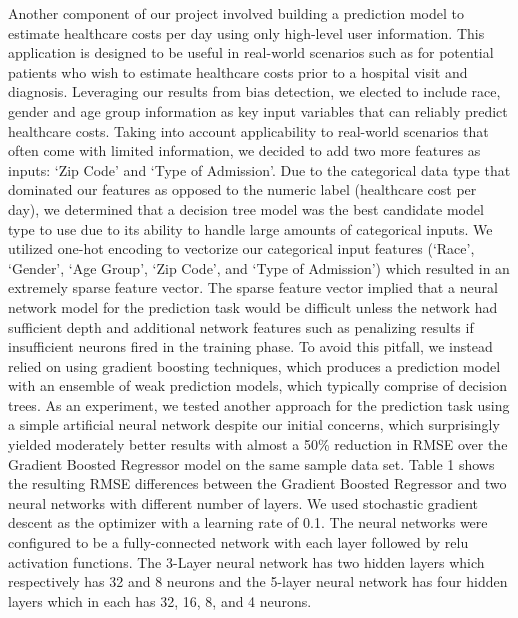 \documentclass[10pt,twocolumn,letterpaper]{article}
\begin{document}
Another component of our project involved building a prediction model to estimate healthcare costs per day using only high-level user information. This application is designed to be useful in real-world scenarios such as for potential patients who wish to estimate healthcare costs prior to a hospital visit and diagnosis. Leveraging our results from bias detection, we elected to include race, gender and age group information as key input variables that can reliably predict healthcare costs. Taking into account applicability to real-world scenarios that often come with limited information, we decided to add two more features as inputs: `Zip Code' and `Type of Admission'. Due to the categorical data type that dominated our features as opposed to the numeric label (healthcare cost per day), we determined that a decision tree model was the best candidate model type to use due to its ability to handle large amounts of categorical inputs. We utilized one-hot encoding to vectorize our categorical input features (`Race', `Gender', `Age Group', `Zip Code', and `Type of Admission') which resulted in an extremely sparse feature vector. The sparse feature vector implied that a neural network model for the prediction task would be difficult unless the network had sufficient depth and additional network features such as penalizing results if insufficient neurons fired in the training phase. To avoid this pitfall, we instead relied on using gradient boosting techniques, which produces a prediction model with an ensemble of weak prediction models, which typically comprise of decision trees. 
As an experiment, we tested another approach for the prediction task using a simple artificial neural network despite our initial concerns, which surprisingly yielded moderately better results with almost a 50\% reduction in RMSE over the Gradient Boosted Regressor model on the same sample data set. Table 1 shows the resulting RMSE differences between the Gradient Boosted Regressor and two neural networks with different number of layers. We used stochastic gradient descent as the optimizer with a learning rate of 0.1. The neural networks were configured to be a fully-connected network with each layer followed by relu activation functions. The 3-Layer neural network has two hidden layers which respectively has 32 and 8 neurons and the 5-layer neural network has four hidden layers which in each has 32, 16, 8, and 4 neurons.
\end{document}
